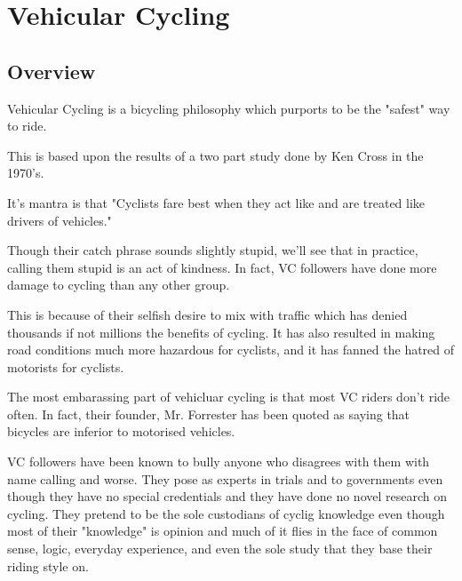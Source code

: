 \chapter{Vehicular Cycling}

\section{Overview}

Vehicular Cycling is a bicycling philosophy which purports to be the "safest" way to ride.

This is based upon the results of a two part study done by Ken Cross in the 1970's.

It's mantra is that "Cyclists fare best when they act like and are treated like drivers of vehicles."

Though their catch phrase sounds slightly stupid, we'll see that in practice, calling them stupid is an act of kindness. In fact, VC followers have done more damage to cycling than any other group. 

This is because of their selfish desire to mix with traffic which has denied thousands if not millions the benefits of cycling. It has also resulted in making road conditions much more hazardous for cyclists, and it has fanned the hatred of motorists for cyclists.

The most embarassing part of vehicluar cycling is that most VC riders don't ride often. In fact, their founder, Mr. Forrester has been quoted as saying that bicycles are inferior to motorised vehicles.

VC followers have been known to bully anyone who disagrees with them with name calling and worse. They pose as experts in trials and to governments even though they have no special credentials and they have done no novel research on cycling. They pretend to be the sole custodians of cyclig knowledge even though most of their "knowledge" is opinion and much of it flies in the face of common sense, logic, everyday experience, and even the sole study that they base their riding style on.
